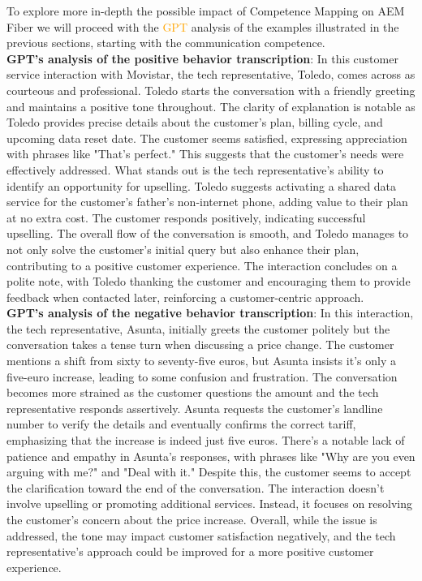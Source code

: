 To explore more in-depth the possible impact of Competence Mapping on AEM Fiber we will proceed with the \textcolor{orange}{GPT} analysis of the examples illustrated in the previous sections, starting with the communication competence.\\

\textbf{GPT's analysis of the positive behavior transcription}: In this customer service interaction with Movistar, the tech representative, Toledo, comes across as courteous and professional. Toledo starts the conversation with a friendly greeting and maintains a positive tone throughout. The clarity of explanation is notable as Toledo provides precise details about the customer's plan, billing cycle, and upcoming data reset date. The customer seems satisfied, expressing appreciation with phrases like "That's perfect." This suggests that the customer's needs were effectively addressed. What stands out is the tech representative's ability to identify an opportunity for upselling. Toledo suggests activating a shared data service for the customer's father's non-internet phone, adding value to their plan at no extra cost. The customer responds positively, indicating successful upselling. The overall flow of the conversation is smooth, and Toledo manages to not only solve the customer's initial query but also enhance their plan, contributing to a positive customer experience. The interaction concludes on a polite note, with Toledo thanking the customer and encouraging them to provide feedback when contacted later, reinforcing a customer-centric approach.\\

\textbf{GPT's analysis of the negative behavior transcription}: In this interaction, the tech representative, Asunta, initially greets the customer politely but the conversation takes a tense turn when discussing a price change. The customer mentions a shift from sixty to seventy-five euros, but Asunta insists it's only a five-euro increase, leading to some confusion and frustration. The conversation becomes more strained as the customer questions the amount and the tech representative responds assertively. Asunta requests the customer's landline number to verify the details and eventually confirms the correct tariff, emphasizing that the increase is indeed just five euros. There's a notable lack of patience and empathy in Asunta's responses, with phrases like "Why are you even arguing with me?" and "Deal with it." Despite this, the customer seems to accept the clarification toward the end of the conversation. The interaction doesn't involve upselling or promoting additional services. Instead, it focuses on resolving the customer's concern about the price increase. Overall, while the issue is addressed, the tone may impact customer satisfaction negatively, and the tech representative's approach could be improved for a more positive customer experience.\\

